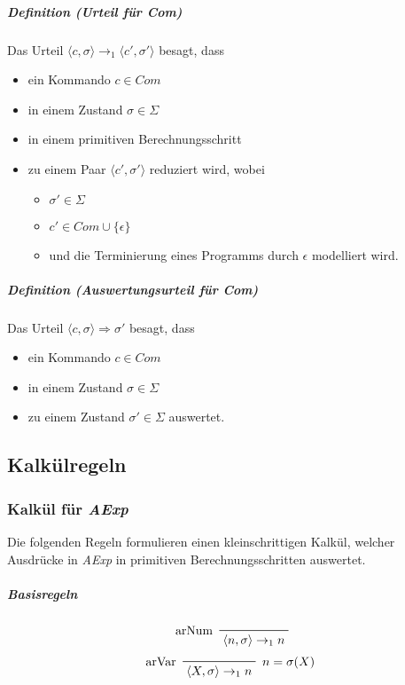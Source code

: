 \documentclass[a4paper, 11pt, accentcolor = tud3b]{tudreport}
\newcommand{\definition}[2]{\subparagraph{Definition (#1)} #2}
\begin{document}
			    \definition{Urteil für \textit{Com}}{
			    	Das Urteil $ \langle c, \sigma \rangle \rightarrow _ 1 \langle c', \sigma' \rangle $ besagt, dass
			    	\begin{itemize}
			    		\item ein Kommando $ c \in \textit{Com} $
			    		\item in einem Zustand $ \sigma \in \Sigma $
			    		\item in einem primitiven Berechnungsschritt
			    		\item zu einem Paar $ \langle c', \sigma' \rangle $ reduziert wird, wobei
				    		\begin{itemize}
				    			\item $ \sigma' \in \Sigma $
				    			\item $ c' \in \textit{Com} \cup \{ \epsilon \} $
				    			\item und die Terminierung eines Programms durch $ \epsilon $ modelliert wird.
				    		\end{itemize}
			    	\end{itemize}
			    }
			    
			    \definition{Auswertungsurteil für \textit{Com}}{
			    	Das Urteil $ \langle c, \sigma \rangle \Rightarrow \sigma' $ besagt, dass
			    	\begin{itemize}
			    		\item ein Kommando $ c \in \textit{Com} $
			    		\item in einem Zustand $ \sigma \in \Sigma $
			    		\item zu einem Zustand $ \sigma' \in \Sigma $ auswertet.
			    	\end{itemize}
			    }
		    
		    \subsection{Kalkülregeln}
			    \subsubsection{Kalkül für \textit{AExp}}
					Die folgenden Regeln formulieren einen kleinschrittigen Kalkül, welcher Ausdrücke in \textit{AExp} in primitiven Berechnungsschritten auswertet.
		
				    \subparagraph{Basisregeln}
				    	\begin{equation*}
					    	\prftree[l]
						    	{ arNum }
						    	{ \langle n, \sigma \rangle \rightarrow _ 1 n }
				    	\end{equation*}
				    	\begin{equation*}
					    	\prftree[l, r]
						    	{ $ n = \sigma(X) $ }
						    	{ arVar }
						    	{ \langle X, \sigma \rangle \rightarrow _ 1 n }
				    	\end{equation*}
			    	
\end{document}
